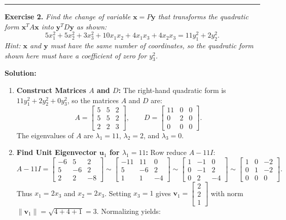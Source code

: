 \documentclass[11pt, letterpaper]{article}
\theoremstyle{definition}
\theoremstyle{remark}
\begin{document}
\medskip
\hrule
\medskip

\textbf{Exercise 2.} \emph{Find the change of variable $\mathbf{x} = P\mathbf{y}$ that transforms the quadratic form $\mathbf{x}^T A \mathbf{x}$ into $\mathbf{y}^T D \mathbf{y}$ as shown:}
\[
5x_1^2 + 5x_2^2 + 3x_3^2 + 10x_1x_2 + 4x_1x_3 + 4x_2x_3 = 11y_1^2 + 2y_2^2.
\]
\emph{Hint: $\mathbf{x}$ and $\mathbf{y}$ must have the same number of coordinates, so the quadratic form shown here must have a coefficient of zero for $y_3^2$.}

\textbf{Solution:}
\begin{enumerate}[label=\textbf{Step \arabic*:}]
    \item \textbf{Construct Matrices $A$ and $D$:}
    The right-hand quadratic form is $11y_1^2 + 2y_2^2 + 0y_3^2$, so the matrices $A$ and $D$ are:
    \[
    A = \begin{bmatrix} 5 & 5 & 2 \\ 5 & 5 & 2 \\ 2 & 2 & 3 \end{bmatrix}, \qquad D = \begin{bmatrix} 11 & 0 & 0 \\ 0 & 2 & 0 \\ 0 & 0 & 0 \end{bmatrix}.
    \]
    The eigenvalues of $A$ are $\lambda_1 = 11$, $\lambda_2 = 2$, and $\lambda_3 = 0$.
    \item \textbf{Find Unit Eigenvector $\mathbf{u}_1$ for $\lambda_1 = 11$:}
    Row reduce $A - 11I$:
    \[
    A - 11I = \begin{bmatrix} -6 & 5 & 2 \\ 5 & -6 & 2 \\ 2 & 2 & -8 \end{bmatrix} \sim \begin{bmatrix} -11 & 11 & 0 \\ 5 & -6 & 2 \\ 1 & 1 & -4 \end{bmatrix} \sim \begin{bmatrix} 1 & -1 & 0 \\ 0 & -1 & 2 \\ 0 & 2 & -4 \end{bmatrix} \sim \begin{bmatrix} 1 & 0 & -2 \\ 0 & 1 & -2 \\ 0 & 0 & 0 \end{bmatrix}.
    \]
    Thus $x_1 = 2x_3$ and $x_2 = 2x_3$. Setting $x_3 = 1$ gives $\mathbf{v}_1 = \begin{bmatrix} 2 \\ 2 \\ 1 \end{bmatrix}$ with norm $\|\mathbf{v}_1\| = \sqrt{4 + 4 + 1} = 3$. Normalizing yields:

\end{enumerate}
\end{document}
